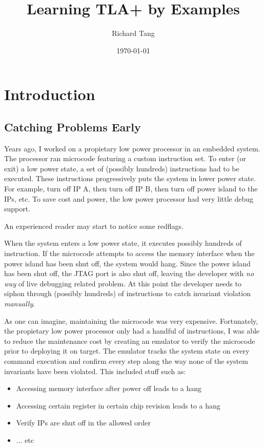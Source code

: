\documentclass{report}
\title{Learning TLA+ by Examples}
\author{Richard Tang}
\date{\today}
\begin{document}
\maketitle
\tableofcontents

\chapter{Introduction}

\section{Catching Problems Early}

Years ago, I worked on a propietary low power processor in an embedded system.
The processor ran microcode featuring a custom instruction set. To enter (or
exit) a low power state, a set of (possibly hundreds) instructions had to be
executed. These instructions progressively puts the system in lower power state.
For example, turn off IP A, then turn off IP B, then turn off power island to
the IPs, etc. To save cost and power, the low power processor had very little
debug support.\newline

An experienced reader may start to notice some redflags.\newline

When the system enters a low power state, it executes possibly hundreds of
instruction.  If the microcode attempts to access the memory interface when the
power island has been shut off, the system would hang. Since the power island
has been shut off, the JTAG port is also shut off, leaving the developer with
\textit{no way} of live debugging related problem. At this point the developer
needs to siphon through (possibly hundreds) of instructions to catch invariant
violation \textit{manually}.\newline

As one can imagine, maintaining the microcode was very expensive. Fortunately,
the propietary low power processor only had a handful of instructions, I was
able to reduce the maintenance cost by creating an emulator to verify the
microcode prior to deploying it on target. The emulator tracks the system state
on every command execution and confirm every step along the way none of the
system invariants have been violated. This included stuff such as: 
\begin{itemize}
    \item Accessing memory interface after power off leads to a hang
    \item Accessing certain register in certain chip revision leads to a hang 
    \item Verify IPs are shut off in the allowed order
    \item ... etc
\end{itemize}
\end{document}
